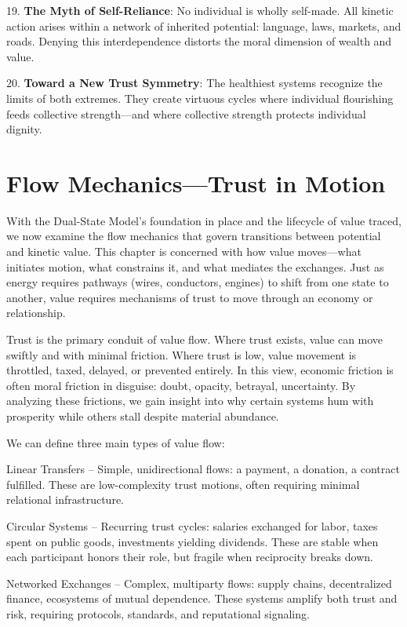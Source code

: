 \documentclass[11pt,oneside]{book}
\begin{document}
19. \textbf{The Myth of Self-Reliance}: No individual is wholly self-made. All kinetic action arises within a network of inherited potential: language, laws, markets, and roads. Denying this interdependence distorts the moral dimension of wealth and value.



20. \textbf{Toward a New Trust Symmetry}: The healthiest systems recognize the limits of both extremes. They create virtuous cycles where individual flourishing feeds collective strength—and where collective strength protects individual dignity.




\section{Flow Mechanics—Trust in Motion}

With the Dual-State Model’s foundation in place and the lifecycle of value traced, we now examine the flow mechanics that govern transitions between potential and kinetic value. This chapter is concerned with how value moves—what initiates motion, what constrains it, and what mediates the exchanges. Just as energy requires pathways (wires, conductors, engines) to shift from one state to another, value requires mechanisms of trust to move through an economy or relationship.

Trust is the primary conduit of value flow. Where trust exists, value can move swiftly and with minimal friction. Where trust is low, value movement is throttled, taxed, delayed, or prevented entirely. In this view, economic friction is often moral friction in disguise: doubt, opacity, betrayal, uncertainty. By analyzing these frictions, we gain insight into why certain systems hum with prosperity while others stall despite material abundance.

We can define three main types of value flow:

    Linear Transfers – Simple, unidirectional flows: a payment, a donation, a contract fulfilled. These are low-complexity trust motions, often requiring minimal relational infrastructure.

    Circular Systems – Recurring trust cycles: salaries exchanged for labor, taxes spent on public goods, investments yielding dividends. These are stable when each participant honors their role, but fragile when reciprocity breaks down.

    Networked Exchanges – Complex, multiparty flows: supply chains, decentralized finance, ecosystems of mutual dependence. These systems amplify both trust and risk, requiring protocols, standards, and reputational signaling.
\end{document}
